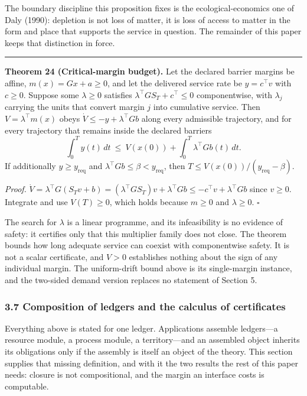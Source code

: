 \documentclass[11pt]{article}
\begin{document}
The boundary discipline this proposition fixes is the ecological-economics one of Daly (1990): depletion is not loss of matter, it is loss of access to matter in the form and place that supports the service in question. The remainder of this paper keeps that distinction in force.

\begin{center}\rule{0.5\linewidth}{0.5pt}\end{center}

\textbf{Theorem 24 (Critical-margin budget).} Let the declared barrier margins be affine,
\(m(x)=Gx+a\ge0\), and let the delivered service rate be \(y=c^{\top}v\) with \(c\ge0\). Suppose some
\(\lambda\ge0\) satisfies \(\lambda^{\top}GS_T+c^{\top}\le0\) componentwise, with \(\lambda_j\)
carrying the units that convert margin \(j\) into cumulative service. Then \(V=\lambda^{\top}m(x)\)
obeys \(\dot V\le-y+\lambda^{\top}Gb\) along every admissible trajectory, and for every trajectory
that remains inside the declared barriers
\[ \int_0^Ty(t)\,dt\ \le\ V(x(0))+\int_0^T\lambda^{\top}Gb(t)\,dt . \]
If additionally \(y\ge y_{\mathrm{req}}\) and \(\lambda^{\top}Gb\le\beta<y_{\mathrm{req}}\), then
\(T\le V(x(0))/(y_{\mathrm{req}}-\beta)\).

\emph{Proof.} \(\dot V=\lambda^{\top}G(S_Tv+b)=(\lambda^{\top}GS_T)v+\lambda^{\top}Gb\le -c^{\top}v+\lambda^{\top}Gb\) since \(v\ge0\). Integrate and use \(V(T)\ge0\), which holds because \(m\ge0\) and \(\lambda\ge0\). \ensuremath{\square}

The search for \(\lambda\) is a linear programme, and its infeasibility is no evidence of safety: it certifies only that this multiplier family does not close. The theorem bounds how long adequate service can coexist with componentwise safety. It is not a scalar certificate, and \(V>0\) establishes nothing about the sign of any individual margin. The uniform-drift bound above is its single-margin instance, and the two-sided demand version replaces no statement of Section 5.



\subsubsection{3.7 Composition of ledgers and the calculus of certificates}\label{composition-of-ledgers-and-the-calculus-of-certificates}

Everything above is stated for one ledger. Applications assemble ledgers---a resource module, a process module, a territory---and an assembled object inherits its obligations only if the assembly is itself an object of the theory. This section supplies that missing definition, and with it the two results the rest of this paper needs: closure is not compositional, and the margin an interface costs is computable.
\end{document}
